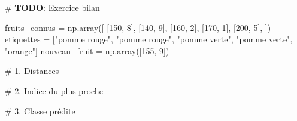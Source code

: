 \documentclass[
  french,
  11pt,
  a4paper,
]{scrbook}
\newenvironment{Shaded}{}{}
\newcommand{\AlertTok}[1]{\textcolor[rgb]{1.00,0.33,0.33}{\textbf{#1}}}
\newcommand{\CommentTok}[1]{\textcolor[rgb]{0.42,0.45,0.49}{#1}}
\newcommand{\DecValTok}[1]{\textcolor[rgb]{0.00,0.36,0.77}{#1}}
\newcommand{\NormalTok}[1]{\textcolor[rgb]{0.14,0.16,0.18}{#1}}
\newcommand{\OperatorTok}[1]{\textcolor[rgb]{0.14,0.16,0.18}{#1}}
\newcommand{\StringTok}[1]{\textcolor[rgb]{0.01,0.18,0.38}{#1}}
\begin{document}
\begin{Shaded}
\begin{Highlighting}[]
\CommentTok{\# }\AlertTok{TODO}\CommentTok{: Exercice bilan}

\NormalTok{fruits\_connus }\OperatorTok{=}\NormalTok{ np.array([}
\NormalTok{    [}\DecValTok{150}\NormalTok{, }\DecValTok{8}\NormalTok{], [}\DecValTok{140}\NormalTok{, }\DecValTok{9}\NormalTok{], [}\DecValTok{160}\NormalTok{, }\DecValTok{2}\NormalTok{], [}\DecValTok{170}\NormalTok{, }\DecValTok{1}\NormalTok{], [}\DecValTok{200}\NormalTok{, }\DecValTok{5}\NormalTok{],}
\NormalTok{])}
\NormalTok{etiquettes }\OperatorTok{=}\NormalTok{ [}\StringTok{"pomme rouge"}\NormalTok{, }\StringTok{"pomme rouge"}\NormalTok{, }\StringTok{"pomme verte"}\NormalTok{, }
              \StringTok{"pomme verte"}\NormalTok{, }\StringTok{"orange"}\NormalTok{]}
\NormalTok{nouveau\_fruit }\OperatorTok{=}\NormalTok{ np.array([}\DecValTok{155}\NormalTok{, }\DecValTok{9}\NormalTok{])}

\CommentTok{\# 1. Distances}


\CommentTok{\# 2. Indice du plus proche}


\CommentTok{\# 3. Classe prédite}
\end{Highlighting}
\end{Shaded}
\end{document}
